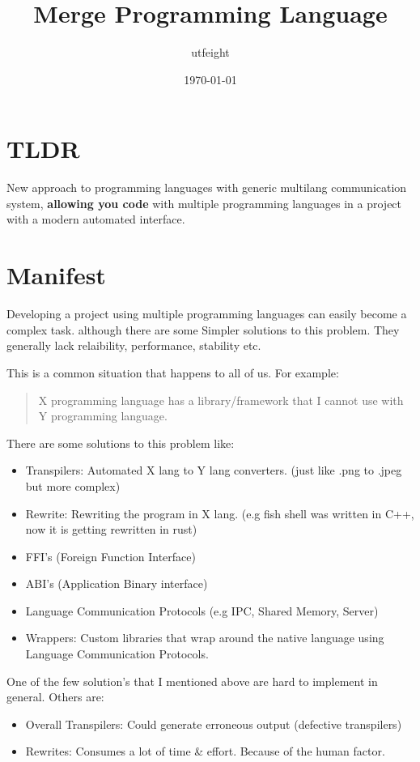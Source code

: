 \documentclass[11pt]{article}
\author{utfeight}
\date{\today}
\title{Merge Programming Language}
\begin{document}
\maketitle
\tableofcontents


\section{TLDR}
\label{sec:org730b44b}

New approach to programming languages with generic multilang communication system,
\textbf{allowing you code} with multiple programming languages in a project with a modern automated interface.

\section{Manifest}
\label{sec:org0968061}
Developing a project using multiple programming languages can easily become a complex task.
although there are some Simpler solutions to this problem. They generally lack relaibility,
performance, stability etc.

This is a common situation that happens to all of us. For example:

\begin{quote}
X programming language has a library/framework that I cannot use with Y programming language.
\end{quote}

There are some solutions to this problem like:
\begin{itemize}
\item Transpilers: Automated X lang to Y lang converters. (just like .png to .jpeg but more complex)
\item Rewrite: Rewriting the program in X lang. (e.g fish shell was written in C++, now it is getting rewritten in rust)
\item FFI's (Foreign Function Interface)
\item ABI's (Application Binary interface)
\item Language Communication Protocols (e.g IPC, Shared Memory, Server)
\item Wrappers: Custom libraries that wrap around the native language using Language Communication Protocols.
\end{itemize}

One of the few solution's that I mentioned above are hard to implement in general. Others are:

\begin{itemize}
\item Overall Transpilers: Could generate erroneous output (defective transpilers)
\item Rewrites: Consumes a lot of time \& effort. Because of the human factor.
\end{itemize}
\end{document}
